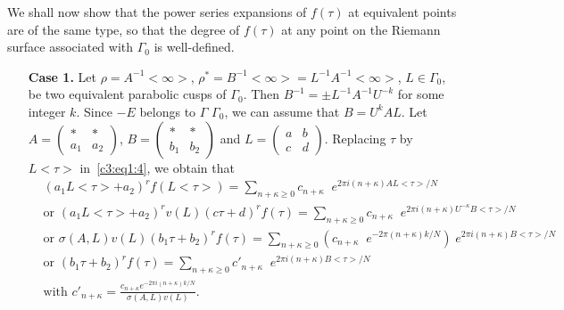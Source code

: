 We shall now show that the power series expansions of $f(\tau)$ at
equivalent points are of the same type, so that the degree of
$f(\tau)$ at any point on the Riemann surface associated with
$\Gamma_0$ is well-defined.
\begin{itemize}
\item[{\textbf{Case 1.}}] Let \pageoriginale $\rho=A^{-1}<\infty>$,
  $\rho^{\ast}=B^{-1}<\infty>=L^{-1}A^{-1}<\infty>$, $L\in
  \Gamma_0$, be two equivalent parabolic cusps of $\Gamma_0$. Then
  $B^{-1}=\pm L^{-1}A^{-1}U^{-k}$ for some integer $k$. Since $-E$
  belongs to $\Gamma$ $\Gamma_0$, we can assume that $B=U^kAL$. Let
  $A= \left(\begin{smallmatrix} \ast & \ast\\a_1 &
    a_2 \end{smallmatrix}\right)$, $B=
  \left(\begin{smallmatrix} \ast & \ast\\b_1 & b_2 \end{smallmatrix}
  \right)$ and $L=\left(\begin{smallmatrix} a&b\\c&d \end{smallmatrix}
  \right)$. Replacing $\tau$ by $L<\tau>$ in~\eqref{c3:eq1:4}, we obtain that 
{\fontsize{10}{12}\selectfont
\begin{align*}
&(a_1 L<\tau>+a_2)^r f(L<\tau>)  = \sum_{n+\kappa \geq 0} c_{n+\kappa}
  \;\; e^{2\pi i (n+\kappa)AL <\tau>/N}\\
&\text{or } (a_1L<\tau>+a_2)^r v(L) (c\tau+d)^r f(\tau)  =
\sum_{n+\kappa \geq 0} c_{n+\kappa} \;\; e^{2\pi i
  (n+\kappa)U^{-\kappa}B<\tau>/N}\\ 
&\text{or } \sigma(A,L) v(L)(b_1\tau+b_2)^r f(\tau)  =
\sum_{n+\kappa\geq 0} (c_{n+\kappa} \;\; e^{-2\pi (n+\kappa)k/N}) \; e^{2\pi
  i(n+\kappa)B<\tau>/N}\\
&\text{or }(b_1\tau+b_2)^rf(\tau)  = \sum_{n+\kappa \geq 0}
c'_{n+\kappa} \;\; e^{2\pi i(n+\kappa)B<\tau>/N}\\
&\text{with } c'_{n+\kappa}  =\frac{c_{n+\kappa}e^{-2\pi
    i(n+\kappa)k/N}}{\sigma(A,L)v(L)}.
\end{align*}}\relax


\end{itemize}
